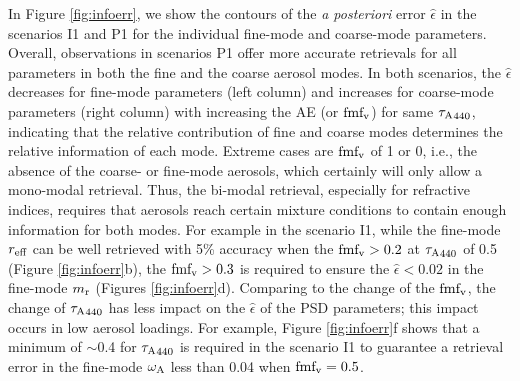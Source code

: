 In Figure \ref{fig:infoerr}, we show the contours of the \textit{a
posteriori} error $\hat\epsilon$ in the scenarios I1 and P1 for the 
individual fine-mode and coarse-mode parameters. Overall, 
observations in scenarios P1 offer more accurate retrievals for all parameters
in both the fine and the coarse aerosol modes. In both scenarios, the
$\hat\epsilon$ decreases for fine-mode parameters (left column) and increases for 
coarse-mode parameters (right column) with increasing the AE (or $\text{fmf}_\text{v}$) for same
${\tau_\text{A}}_{440}$, indicating that the relative contribution
of fine and coarse modes determines the relative information of each
mode. Extreme cases are $\text{fmf}_\text{v}$ of 1 or 0, i.e., the absence of the
coarse- or fine-mode aerosols, which certainly will only allow a
mono-modal retrieval. Thus, the bi-modal retrieval, especially for
refractive indices, requires that aerosols reach certain mixture
conditions to contain enough information for both modes. For example in
the scenario I1, while the fine-mode $r_\text{eff}$ can be well retrieved with 5\%
accuracy when the $\text{fmf}_\text{v}>0.2$ at ${\tau_\text{A}}_{440}$ of 0.5 (Figure
\ref{fig:infoerr}b), the $\text{fmf}_\text{v}>0.3$ is required to ensure the
$\hat\epsilon<0.02$ in the fine-mode $m_\text{r}$ (Figures
\ref{fig:infoerr}d). Comparing to the change of the $\text{fmf}_\text{v}$, the change of
${\tau_\text{A}}_{440}$ has less impact on the $\hat\epsilon$ of the PSD parameters;
this impact occurs in low aerosol loadings. For example, Figure
\ref{fig:infoerr}f shows that a minimum of $\sim$0.4
for ${\tau_\text{A}}_{440}$ is required in the scenario I1 to guarantee a retrieval
error in the fine-mode $\omega_\text{A}$ less than 0.04 when $\text{fmf}_\text{v}=0.5$. 

